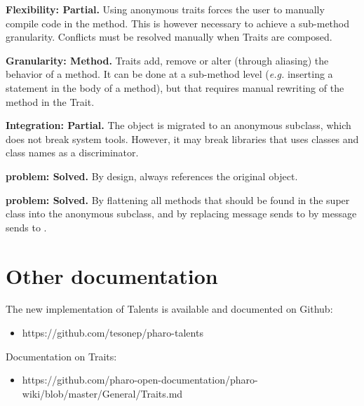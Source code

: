 \documentclass[10pt,twoside,english]{_support/latex/sbabook/sbabook}
\begin{document}
\textbf{Flexibility: Partial.} Using anonymous traits forces the user to manually compile code in the method. This is however necessary to achieve a sub-method granularity. Conflicts must be resolved manually when Traits are composed.

\textbf{Granularity: Method.} Traits add, remove or alter (through aliasing) the behavior of a method. It can be done at a sub-method level (\textit{e.g.} inserting a statement in the body of a method), but that requires manual rewriting of the method in the Trait.

\textbf{Integration: Partial.} The object is migrated to an anonymous subclass, which does not break system tools. However, it may break libraries that uses classes and class names as a discriminator.

\textbf{ problem: Solved.} By design,  always references the original object.

\textbf{ problem: Solved.} By flattening all methods that should be found in the super class into the anonymous subclass, and by replacing message sends to  by message sends to .
\section{Other documentation}
The new implementation of Talents is available and documented on Github:

\begin{itemize}
\item https://github.com/tesonep/pharo-talents
\end{itemize}

Documentation on Traits:

\begin{itemize}
\item https://github.com/pharo-open-documentation/pharo-wiki/blob/master/General/Traits.md
\end{itemize}






\backmatter

\end{document}
